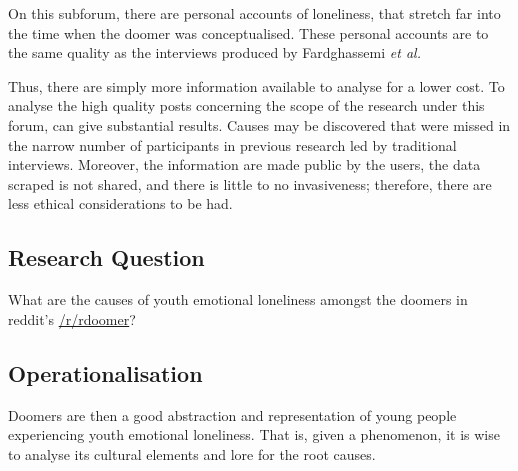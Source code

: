 \documentclass{article}
\begin{document}
On this subforum, there are personal accounts of loneliness, that stretch far into the time when the doomer was conceptualised. 
These personal accounts are to the same quality as the interviews produced by Fardghassemi \textit{et al.}

Thus, there are simply more information available to analyse for a lower cost. To analyse the high quality posts concerning the scope of the research under this forum, can give substantial results.
Causes may be discovered that were missed in the narrow number of participants in previous research led by traditional interviews.
Moreover, the information are made public by the users, the data scraped is not shared, and there is little to no invasiveness; therefore, there are less ethical considerations to be had.

\subsection{Research Question}

What are the causes of youth emotional loneliness amongst the doomers in reddit's
\href{www.reddit.com/r/doomer}{/r/rdoomer}?

\subsection{Operationalisation}

Doomers are then a good abstraction and representation of young people experiencing youth emotional loneliness. 
That is, given a phenomenon, it is wise to analyse its cultural elements and lore for the root causes. 
\end{document}
